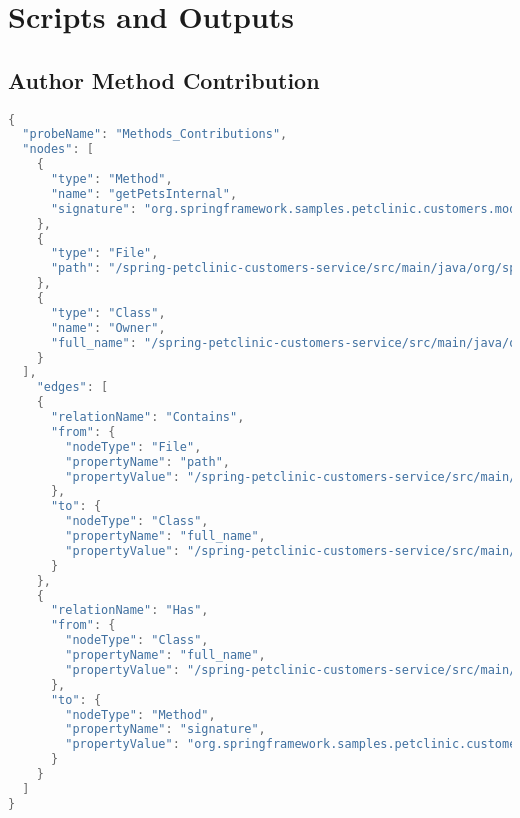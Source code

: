 \chapter{Scripts and Outputs}\label{appendix_a}

\section{Author Method Contribution}\label{appendix_sec:author_method_contributions}
\begin{lstlisting}[language=java]
{
  "probeName": "Methods_Contributions",
  "nodes": [
    {
      "type": "Method",
      "name": "getPetsInternal",
      "signature": "org.springframework.samples.petclinic.customers.model.Owner.getPetsInternal()"
    },
    {
      "type": "File",
      "path": "/spring-petclinic-customers-service/src/main/java/org/springframework/samples/petclinic/customers/model/Owner.java"
    },
    {
      "type": "Class",
      "name": "Owner",
      "full_name": "/spring-petclinic-customers-service/src/main/java/org/springframework/samples/petclinic/customers/model/Owner.java:Owner"
    }
  ],
    "edges": [
    {
      "relationName": "Contains",
      "from": {
        "nodeType": "File",
        "propertyName": "path",
        "propertyValue": "/spring-petclinic-customers-service/src/main/java/org/springframework/samples/petclinic/customers/model/Owner.java"
      },
      "to": {
        "nodeType": "Class",
        "propertyName": "full_name",
        "propertyValue": "/spring-petclinic-customers-service/src/main/java/org/springframework/samples/petclinic/customers/model/Owner.java:Owner"
      }
    },
    {
      "relationName": "Has",
      "from": {
        "nodeType": "Class",
        "propertyName": "full_name",
        "propertyValue": "/spring-petclinic-customers-service/src/main/java/org/springframework/samples/petclinic/customers/model/Owner.java:Owner"
      },
      "to": {
        "nodeType": "Method",
        "propertyName": "signature",
        "propertyValue": "org.springframework.samples.petclinic.customers.model.Owner.getPetsInternal()"
      }
    }
  ]
}
\end{lstlisting}


